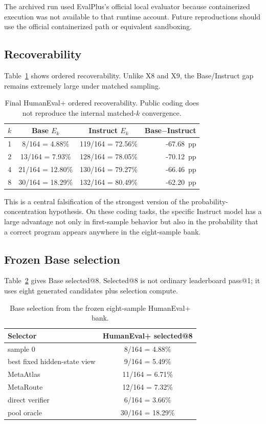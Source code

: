 \documentclass[11pt]{article}
\newcommand{\pp}{~pp}
\begin{document}
The archived run used EvalPlus's official local evaluator because containerized execution was not available to that runtime account. Future reproductions should use the official containerized path or equivalent sandboxing.

\subsection{Recoverability}

Table~\ref{tab:publicrecover} shows ordered recoverability. Unlike X8 and X9, the Base/Instruct gap remains extremely large under matched sampling.

\begin{table}[h]
\centering
\begin{tabular}{rccr}
\toprule
$k$ & Base $E_k$ & Instruct $E_k$ & Base$-$Instruct \\
\midrule
1 & 8/164 = 4.88\% & 119/164 = 72.56\% & -67.68\pp \\
2 & 13/164 = 7.93\% & 128/164 = 78.05\% & -70.12\pp \\
4 & 21/164 = 12.80\% & 130/164 = 79.27\% & -66.46\pp \\
8 & 30/164 = 18.29\% & 132/164 = 80.49\% & -62.20\pp \\
\bottomrule
\end{tabular}
\caption{Final HumanEval+ ordered recoverability. Public coding does not reproduce the internal matched-$k$ convergence.}
\label{tab:publicrecover}
\end{table}

This is a central falsification of the strongest version of the probability-concentration hypothesis. On these coding tasks, the specific Instruct model has a large advantage not only in first-sample behavior but also in the probability that a correct program appears anywhere in the eight-sample bank.

\subsection{Frozen Base selection}

Table~\ref{tab:publicselect} gives Base selected@8. Selected@8 is not ordinary leaderboard pass@1; it uses eight generated candidates plus selection compute.

\begin{table}[h]
\centering
\begin{tabular}{lc}
\toprule
Selector & HumanEval+ selected@8 \\
\midrule
sample 0 & 8/164 = 4.88\% \\
best fixed hidden-state view & 9/164 = 5.49\% \\
MetaAtlas & 11/164 = 6.71\% \\
MetaRoute & 12/164 = 7.32\% \\
direct verifier & 6/164 = 3.66\% \\
pool oracle & 30/164 = 18.29\% \\
\bottomrule
\end{tabular}
\caption{Base selection from the frozen eight-sample HumanEval+ bank.}
\label{tab:publicselect}
\end{table}
\end{document}
